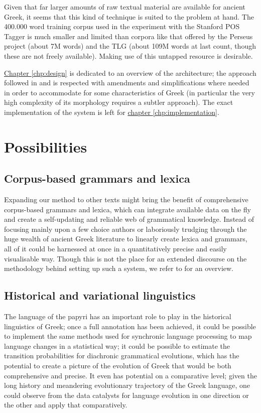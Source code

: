 Given that far larger amounts of raw textual material are available
for ancient Greek, it seems that this kind of technique is suited to
the problem at hand. The 400.000 word training corpus used in the
experiment with the Stanford POS Tagger is much smaller and limited
than corpora like that offered by the Perseus project (about 7M words)
and the TLG (about 109M words at last count, though these are not
freely available). Making use of this untapped resource is
desirable. 

\hyperref[chp:design]{Chapter \ref*{chp:design}} is dedicated to an
overview of the architecture; the approach followed in
\citet{collobert-2011} and \citet{turian2010word} is respected with
amendments and simplifications where needed in order to accommodate
for some characteristics of Greek (in particular the very high
complexity of its morphology requires a subtler approach). The exact
implementation of the system is left for
\hyperref[chp:implementation]{chapter \ref*{chp:implementation}}.

\section{Possibilities}

\subsection{Corpus-based grammars and lexica}
\label{sec:corpusbasedgrammars}
Expanding our method to other texts might bring the benefit of
comprehensive corpus-based grammars and lexica, which can integrate
available data on the fly and create a self-updating and reliable web
of grammatical knowledge. Instead of focusing mainly upon a few choice
authors or laboriously trudging through the huge wealth of ancient
Greek literature to linearly create lexica and grammars, all of it
could be harnessed at once in a quantitatively precise and easily
visualisable way. Though this is not the place for an extended
discourse on the methodology behind setting up such a system, we refer
to \cite{bamman2008building,bammandhq2009} for an overview.

\subsection{Historical and variational linguistics} %
\label{sec:histlinguistics}
The language of the papyri has an important role to play in the
historical linguistics of Greek; once a full annotation has been
achieved, it could be possible to implement the same methods used for
synchronic language processing to map language changes in a
statistical way; it could be possible to estimate the transition
probabilities for diachronic grammatical evolutions, which has the
potential to create a picture of the evolution of Greek that would be
both comprehensive and precise. It even has potential on a comparative
level; given the long history and meandering evolutionary trajectory
of the Greek language, one could observe from the data catalysts for
language evolution in one direction or the other and apply that
comparatively.

